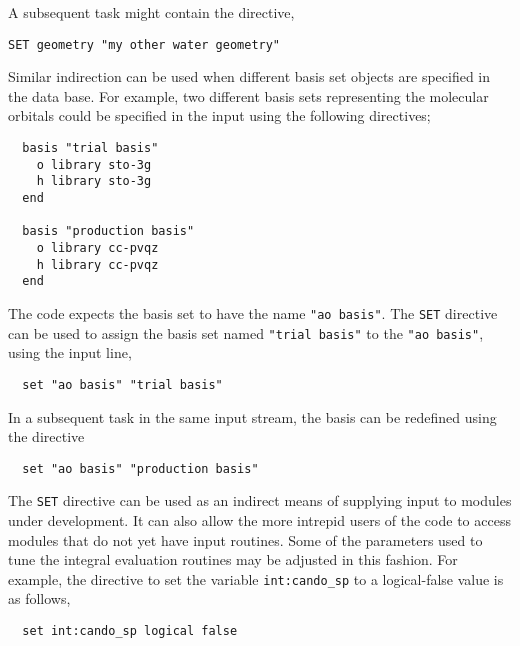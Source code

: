 A subsequent task might contain the directive,

\begin{verbatim}
SET geometry "my other water geometry"
\end{verbatim}

Similar indirection can be used when different basis set objects 
are specified in the data base.  For example, two different basis
sets representing the molecular orbitals could be specified in the input 
using the following directives;

\begin{verbatim}
  basis "trial basis"
    o library sto-3g
    h library sto-3g
  end

  basis "production basis"
    o library cc-pvqz
    h library cc-pvqz
  end
\end{verbatim}

The code expects the basis set to have the name \verb+"ao basis"+.
The \verb+SET+ directive can be used to assign the basis set named
\verb+"trial basis"+ to the \verb+"ao basis"+, using the input line,

\begin{verbatim}
  set "ao basis" "trial basis"
\end{verbatim}

In a subsequent task in the same input stream, the basis can be redefined
using the directive

\begin{verbatim}
  set "ao basis" "production basis"
\end{verbatim}

The \verb+SET+ directive can be used as an indirect means of 
supplying input to modules under development.  It can also allow the more 
intrepid users of the code to access modules that do not yet have
input routines.  Some of the parameters used to tune the
integral evaluation routines may be adjusted in this fashion.  
For example, the directive 
to set the variable \verb+int:cando_sp+ to a 
logical-false value is as follows,
 
\begin{verbatim}
  set int:cando_sp logical false
\end{verbatim}

